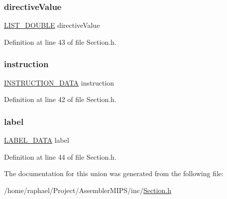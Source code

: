 \subsubsection{\texorpdfstring{directive\+Value}{directiveValue}}
{\footnotesize\ttfamily \mbox{\hyperlink{_double_list_generic_8h_a1e5b384fadfbaaa8da74a3c3212fae13}{L\+I\+S\+T\+\_\+\+D\+O\+U\+B\+LE}} directive\+Value}



Definition at line 43 of file Section.\+h.

\mbox{\label{union_c_o_l_l_e_c_t_i_o_n___d_a_t_a_ae3d172a8ca561cb2c419b8cce6366f5c}} 
\subsubsection{\texorpdfstring{instruction}{instruction}}
{\footnotesize\ttfamily \mbox{\hyperlink{struct_i_n_s_t_r_u_c_t_i_o_n___d_a_t_a}{I\+N\+S\+T\+R\+U\+C\+T\+I\+O\+N\+\_\+\+D\+A\+TA}} instruction}



Definition at line 42 of file Section.\+h.

\mbox{\label{union_c_o_l_l_e_c_t_i_o_n___d_a_t_a_ac8d2ad7f5ee5b7f800c2a7ed022f3280}} 
\subsubsection{\texorpdfstring{label}{label}}
{\footnotesize\ttfamily \mbox{\hyperlink{struct_l_a_b_e_l___d_a_t_a}{L\+A\+B\+E\+L\+\_\+\+D\+A\+TA}} label}



Definition at line 44 of file Section.\+h.



The documentation for this union was generated from the following file\+:\begin{DoxyCompactItemize}
\item 
/home/raphael/\+Project/\+Assembler\+M\+I\+P\+S/inc/\mbox{\hyperlink{_section_8h}{Section.\+h}}\end{DoxyCompactItemize}

